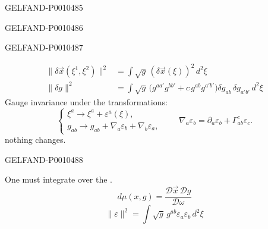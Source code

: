 \begin{GelfandAdjacentEvidence}{GELFAND-P001048}{5}

\end{GelfandAdjacentEvidence}
\begin{GelfandAdjacentEvidence}{GELFAND-P001048}{6}

\end{GelfandAdjacentEvidence}
\begin{GelfandAdjacentEvidence}{GELFAND-P001048}{7}

\begin{equation*}
\begin{aligned}
\|\delta\vec{x}(\xi^1,\xi^2)\|^2
&=\int\sqrt{g}\,(\delta\vec{x}(\xi))^2\,d^2\xi\\
\|\delta g\|^2
&=\int\sqrt{g}\,
\bigl(g^{aa'}g^{bb'}+c\,g^{ab}g^{a'b'}\bigr)
\delta g_{ab}\,\delta g_{a'b'}\,d^2\xi
\end{aligned}
\tag{6}
\end{equation*}
Gauge invariance under the transformations:
\begin{equation*}
\begin{cases}
\xi^a\to\xi^a+\varepsilon^a(\xi),\\
g_{ab}\to g_{ab}+\nabla_a\varepsilon_b+\nabla_b\varepsilon_a,
\end{cases}
\qquad
\nabla_a\varepsilon_b=\partial_a\varepsilon_b+\Gamma_{ab}^{c}\varepsilon_c.
\tag{7}
\end{equation*}
nothing changes.
\end{GelfandAdjacentEvidence}
\begin{GelfandAdjacentEvidence}{GELFAND-P001048}{8}


One must integrate over the .
\begin{equation*}
d\mu(x,g)=\frac{\mathcal{D}\vec{x}\,\mathcal{D}g}{\mathcal{D}\omega}
\tag{8}
\end{equation*}
\begin{equation*}
\|\varepsilon\|^2=\int\sqrt{g}\,g^{ab}\varepsilon_a\varepsilon_b\,d^2\xi
\tag{9}
\end{equation*}
\end{GelfandAdjacentEvidence}
